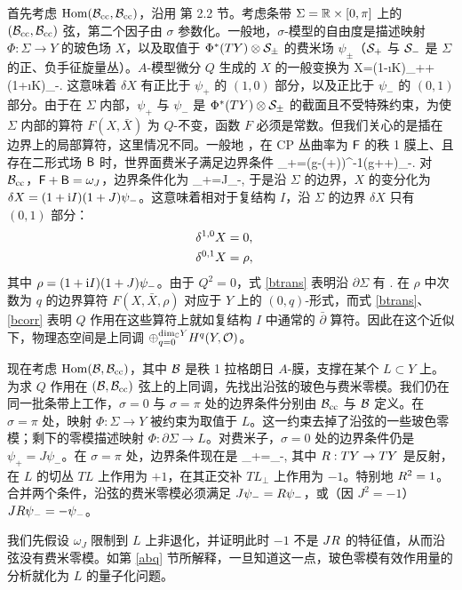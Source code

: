 首先考虑 ${\mathrm{Hom}}({\mathcal B}_{\mathrm{cc}},{\mathcal B}_{\mathrm{cc}})$，沿用 \cite{GW} 第 2.2 节。考虑条带 $\Sigma={\mathbb R}\times[0,\pi]$ 上的 $({\mathcal B}_{\mathrm{cc}},{\mathcal B}_{\mathrm{cc}})$ 弦，第二个因子由 $\sigma$ 参数化。一般地，$\sigma$-模型的自由度是描述映射 $\Phi:\Sigma\to Y$ 的玻色场 $X$，以及取值于 $\Phi^*(TY)\otimes{\mathcal S}_\pm$ 的费米场 $\psi_\pm$（${\mathcal S}_+$ 与 ${\mathcal S}_-$ 是 $\Sigma$ 的正、负手征旋量丛）。$A$-模型微分 $Q$ 生成的 $X$ 的一般变换为
\be\label{windo}\delta X=(1-\i K)\psi_++(1+\i K)\psi_-.\ee
这意味着 $\delta X$ 有正比于 $\psi_+$ 的 $(1,0)$ 部分，以及正比于 $\psi_-$ 的 $(0,1)$ 部分。由于在 $\Sigma$ 内部，$\psi_+$ 与 $\psi_-$ 是 $\Phi^*(TY)\otimes{\mathcal S}_\pm$ 的截面且不受特殊约束，为使 $\Sigma$ 内部的算符 $F(X,\bar X)$ 为 $Q$-不变，函数 $F$ 必须是常数。但我们关心的是插在边界上的局部算符，这里情况不同。一般地 \cite{ACNY}，在 CP 丛曲率为 ${\sf F}$ 的秩 1 膜上、且存在二形式场 ${\sf B}$ 时，世界面费米子满足边界条件
\be\label{wiffo}\psi_+=(g-(\sF+\sB))^{-1}(g+\sF+\sB)\psi_-.\ee
对 ${\mathcal B}_{\mathrm{cc}}$，${\sf F}+{\sf B}=\omega_J$，边界条件化为
\be\label{nelm}\psi_+=J\psi_-,\ee
于是沿 $\Sigma$ 的边界，$X$ 的变分化为 $\delta X=(1+{\mathrm i} I)(1+J)\psi_-$。这意味着相对于复结构 $I$，沿 $\Sigma$ 的边界 $\delta X$ 只有 $(0,1)$ 部分：
\begin{align}\label{btrans}\delta^{1,0}X&=0,\cr
\delta^{0,1}X&=\rho,\end{align}
其中 $\rho=(1+{\mathrm i} I)(1+J)\psi_-$。由于 $Q^2=0$，式 \eqref{btrans} 表明沿 $\partial\Sigma$ 有
\be\label{bcorr}\delta{}.\ee
在 $\rho$ 中次数为 $q$ 的边界算符 $F(X,\bar X,\rho)$ 对应于 $Y$ 上的 $(0,q)$-形式，而式 \eqref{btrans}、\eqref{bcorr} 表明 $Q$ 作用在这些算符上就如复结构 $I$ 中通常的 $\bar\partial$ 算符。因此在这个近似下，物理态空间是上同调 $\oplus_{q=0}^{{\mathrm{dim}}_{\mathbb C} Y}H^q(Y,{\mathcal O})$。

现在考虑 ${\mathrm{Hom}}({\mathcal B},{\mathcal B}_{\mathrm{cc}})$，其中 ${\mathcal B}$ 是秩 1 拉格朗日 $A$-膜，支撑在某个 $L\subset Y$ 上。为求 $Q$ 作用在 $({\mathcal B},{\mathcal B}_{\mathrm{cc}})$ 弦上的上同调，先找出沿弦的玻色与费米零模。我们仍在同一批条带上工作，$\sigma=0$ 与 $\sigma=\pi$ 处的边界条件分别由 ${\mathcal B}_{\mathrm{cc}}$ 与 ${\mathcal B}$ 定义。在 $\sigma=\pi$ 处，映射 $\Phi:\Sigma\to Y$ 被约束为取值于 $L$。这一约束去掉了沿弦的一些玻色零模；剩下的零模描述映射 $\Phi:\partial\Sigma\to L$。对费米子，$\sigma=0$ 处的边界条件仍是 $\psi_+=J\psi_-$。在 $\sigma=\pi$ 处，边界条件现在是
\be\label{kilo}\psi_+=\Rf\psi_-,\ee
其中 ${R}:TY\to TY$ 是反射，在 $L$ 的切丛 $TL$ 上作用为 $+1$，在其正交补 $TL_\perp$ 上作用为 $-1$。特别地 ${R}^2=1$。合并两个条件，沿弦的费米零模必须满足 $J\psi_-={R}\psi_-$，或（因 $J^2=-1$）$J{R}\psi_-=-\psi_-$。

我们先假设 $\omega_J$ 限制到 $L$ 上非退化，并证明此时 $-1$ 不是 $J{R}$ 的特征值，从而沿弦没有费米零模。如第 \ref{abq} 节所解释，一旦知道这一点，玻色零模有效作用量的分析就化为 $L$ 的量子化问题。

